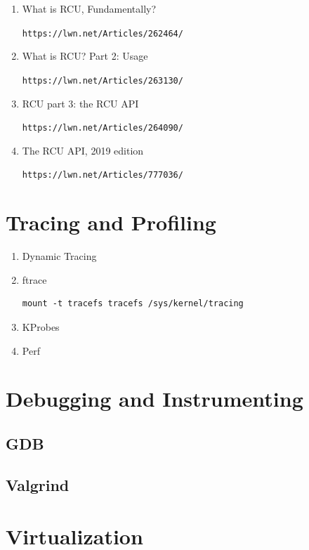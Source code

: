 \documentclass[12pt,a4paper]{article}
\begin{document}
\begin{enumerate}

\item What is RCU, Fundamentally?

	\texttt{https://lwn.net/Articles/262464/}

\item What is RCU? Part 2: Usage

	\texttt{https://lwn.net/Articles/263130/}

\item RCU part 3: the RCU API

	\texttt{https://lwn.net/Articles/264090/}

\item The RCU API, 2019 edition

	\texttt{https://lwn.net/Articles/777036/}

\end{enumerate}

\section{Tracing and Profiling}

\begin{enumerate}
\item Dynamic Tracing
\item ftrace
\begin{verbatim}
mount -t tracefs tracefs /sys/kernel/tracing
\end{verbatim}
\item KProbes
\item Perf
\end{enumerate}

\section{Debugging and Instrumenting}

\subsection{GDB}

\subsection{Valgrind}

\section{Virtualization}
\end{document}
